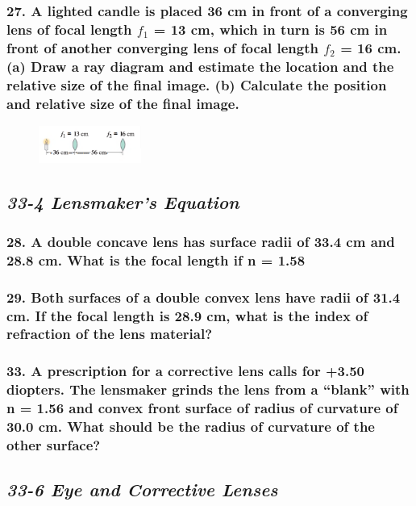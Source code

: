 \documentclass{article}
\begin{document}
\subsubsection*{
    27. A lighted candle is placed 36 cm in front of a converging lens of focal length $f_1$ = 13 cm,
    which in turn is 56 cm in front of another converging lens of focal length $f_2$ = 16 cm. (a) Draw a 
    ray diagram and estimate the location and the relative size of the final image. (b) Calculate 
    the position and relative size of the final image.
}
\begin{figure}[h]
    \begin{center}
        \includegraphics[width=0.3\textwidth]{figures/p27.png}
    \end{center}
\end{figure}
\newpage
\begin{center}
    \subsection*{\textbf{\textit{33-4 Lensmaker's Equation}}}
\end{center}
\subsubsection*{
    28. A double concave lens has surface radii of 33.4 cm and 28.8 cm. What is the focal length if n = 1.58
}
\subsubsection*{
    29. Both surfaces of a double convex lens have radii of 31.4 cm. If the focal length is 28.9 cm, what is
    the index of refraction of the lens material?
}
\subsubsection*{
    33. A prescription for a corrective lens calls for +3.50 diopters. The lensmaker grinds the lens from a
    “blank” with n = 1.56 and convex front surface of radius of curvature of 30.0 cm. What should be the radius
    of curvature of the other surface?
}
\newpage
\begin{center}
    \subsection*{\textbf{\textit{33-6 Eye and Corrective Lenses}}}
\end{center}
\end{document}
